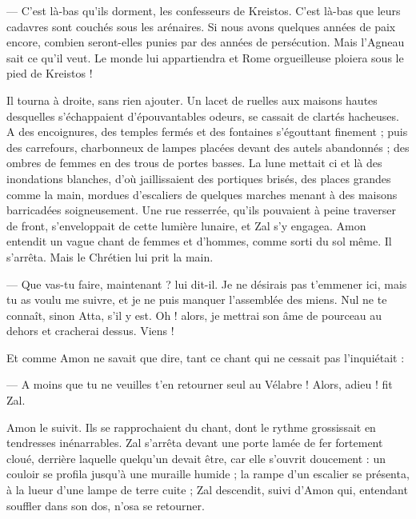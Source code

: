 \documentclass[a4paper, 11pt, oneside, polutonikogreek, french]{article}
\begin{document}
--- C'est là-bas qu'ils dorment, les confesseurs de Kreistos. C'est là-bas que leurs cadavres sont couchés sous les arénaires. Si nous avons quelques années de paix encore, combien seront-elles punies par des années de persécution. Mais l'Agneau sait ce qu'il veut. Le monde lui appartiendra et Rome orgueilleuse ploiera sous le pied de Kreistos !

Il tourna à droite, sans rien ajouter. Un lacet de ruelles aux maisons hautes desquelles s'échappaient d'épouvantables odeurs, se cassait de clartés hacheuses. A des encoignures, des temples fermés et des fontaines s'égouttant finement ; puis des carrefours, charbonneux de lampes placées devant des autels abandonnés ; des ombres de femmes en des trous de portes basses. La lune mettait ci et là des inondations blanches, d'où jaillissaient des portiques brisés, des places grandes comme la main, mordues d'escaliers de quelques marches menant à des maisons barricadées soigneusement. Une rue resserrée, qu'ils pouvaient à peine traverser de front, s'enveloppait de cette lumière lunaire, et Zal s'y engagea. Amon entendit un vague chant de femmes et d'hommes, comme sorti du sol même. Il s'arrêta. Mais le Chrétien lui prit la main.

--- Que vas-tu faire, maintenant ? lui dit-il. Je ne désirais pas t'emmener ici, mais tu as voulu me suivre, et je ne puis manquer l'assemblée des miens. Nul ne te connaît, sinon Atta, s'il y est. Oh ! alors, je mettrai son âme de pourceau au dehors et cracherai dessus. Viens !

Et comme Amon ne savait que dire, tant ce chant qui ne cessait pas l'inquiétait :

--- A moins que tu ne veuilles t'en retourner seul au Vélabre ! Alors, adieu ! fit Zal.

Amon le suivit. Ils se rapprochaient du chant, dont le rythme grossissait en tendresses inénarrables. Zal s'arrêta devant une porte lamée de fer fortement cloué, derrière laquelle quelqu'un devait être, car elle s'ouvrit doucement : un couloir se profila jusqu'à une muraille humide ; la rampe d'un escalier se présenta, à la lueur d'une lampe de terre cuite ; Zal descendit, suivi d'Amon qui, entendant souffler dans son dos, n'osa se retourner.
\clearpage
\subsection{}
\end{document}
